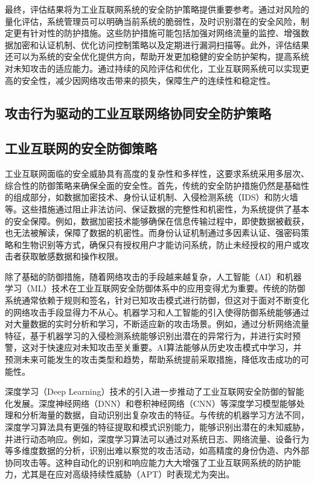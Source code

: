 最终，评估结果将为工业互联网系统的安全防护策略提供重要参考。通过对风险的量化评估，系统管理员可以明确当前系统的脆弱性，及时识别潜在的安全风险，制定更有针对性的防护措施。这些防护措施可能包括加强对网络流量的监控、增强数据加密和认证机制、优化访问控制策略以及定期进行漏洞扫描等。此外，评估结果还可以为系统的安全优化提供方向，帮助开发更加稳健的安全防护架构，提高系统对未知攻击的适应能力。通过持续的风险评估和优化，工业互联网系统可以实现更高的安全性，减少因网络攻击带来的损失，保障生产的连续性和稳定性。


\subsection{攻击行为驱动的工业互联网络协同安全防护策略}

\subsection{工业互联网的安全防御策略}

工业互联网面临的安全威胁具有高度的复杂性和多样性，这要求系统采用多层次、综合性的防御策略来确保全面的安全性。首先，传统的安全防护措施仍然是基础性的组成部分，如数据加密技术、身份认证机制、入侵检测系统（IDS）和防火墙等。这些措施通过阻止非法访问、保证数据的完整性和机密性，为系统提供了基本的安全保障。例如，数据加密技术能够确保在信息传输过程中，即使数据被截获，也无法被解读，保障了数据的机密性。而身份认证机制通过多因素认证、强密码策略和生物识别等方式，确保只有授权用户才能访问系统，防止未经授权的用户或攻击者获取敏感数据和操作权限。

除了基础的防御措施，随着网络攻击的手段越来越复杂，人工智能（AI）和机器学习（ML）技术在工业互联网安全防御体系中的应用变得尤为重要。传统的防御系统通常依赖于规则和签名，针对已知攻击模式进行防御，但这对于面对不断变化的网络攻击手段显得力不从心。机器学习和人工智能的引入使得防御系统能够通过对大量数据的实时分析和学习，不断适应新的攻击场景。例如，通过分析网络流量特征，基于机器学习的入侵检测系统能够识别出潜在的异常行为，并进行实时预警，这对于快速应对未知攻击至关重要。AI算法能够从历史攻击模式中学习，并预测未来可能发生的攻击类型和趋势，帮助系统提前采取措施，降低攻击成功的可能性。

深度学习（Deep Learning）技术的引入进一步推动了工业互联网安全防御的智能化发展。深度神经网络（DNN）和卷积神经网络（CNN）等深度学习模型能够处理和分析海量的数据，自动识别出复杂攻击的特征。与传统的机器学习方法不同，深度学习算法具有更强的特征提取和模式识别能力，能够识别出潜在的未知威胁，并进行动态响应。例如，深度学习算法可以通过对系统日志、网络流量、设备行为等多维度数据的分析，识别出难以察觉的攻击活动，如高精度的身份伪造、内外部协同攻击等。这种自动化的识别和响应能力大大增强了工业互联网系统的防护能力，尤其是在应对高级持续性威胁（APT）时表现尤为突出。


